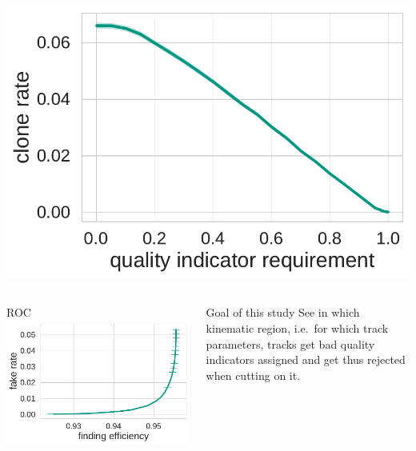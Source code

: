 \documentclass[18pt, aspectratio=169]{beamer}
\begin{document}
\begin{frame}
\begin{columns}
    \begin{column}{.33\textwidth}
      \centering
      \includegraphics[width=\textwidth]{figures/combined-qi/fullqi_clone_rate.pdf}
    \end{column}
  \end{columns}
  \begin{columns}
    \begin{column}{.4\textwidth}
      \centering
      ROC
      \includegraphics[width=\textwidth]{figures/combined-qi/fullqi_roc_curve.pdf}
    \end{column}
    \begin{column}{.6\textwidth}
      \begin{block}{Goal of this study}
    See in which kinematic region, i.e.\ for which track parameters, tracks get bad quality
    indicators assigned and get thus rejected when cutting on it.
  \end{block}
    \end{column}
  \end{columns}
\end{frame}
\end{document}
